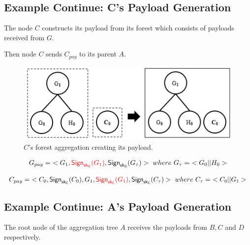 \documentclass[%
  slidesonly,%
  semlayer%
  ]{seminar}                                  %
\newcommand{\sk}{\sf{sk}}
\begin{document}
\begin{slide}
    \subsection*{Example Continue: C's Payload Generation}  
      The node $C$ constructs its payload from its forest which consists of payloads received from $G$.

      Then node $C$ sends $C_{pay}$ to its parent $A$.

      \begin{figure}[h!]
        \centering
        \includegraphics[scale = 0.5]{images/c-forest-payload.png}
        \caption{$C$'s forest aggregation creating its payload.}
        \label{fig:c-forest-payload}
      \end{figure}
      \begin{equation*}
        \begin{array}{l}
          G_{pay} =\ <G_{1},\textcolor{red}{\textsf{Sign}_{\sk_{G}}(G_{1})}, \textsf{Sign}_{\sk_{G}}(G_{\tau})>\ where\ G_{\tau} =\ <G_{0} || H_{0}>\\
        \end{array}
      \end{equation*}
      
      \begin{equation*}
        \begin{array}{l}
          C_{pay} =\ <C_{0},\textsf{Sign}_{\sk_{C}}(C_{0}),G_{1},\textcolor{red}{\textsf{Sign}_{\sk_{C}}(G_{1})}, \textsf{Sign}_{\sk_{C}}(C_{\tau})>\ where\ C_{\tau} =\ <C_{0} || G_{1}>\\
        \end{array}
      \end{equation*}

      \vfill
      \clearpage

    \subsection*{Example Continue: A's Payload Generation}  

      The root node of the aggregation tree $A$ receives the payloads from $B,C$ and $D$ respectively.
      

\end{slide}
\end{document}

